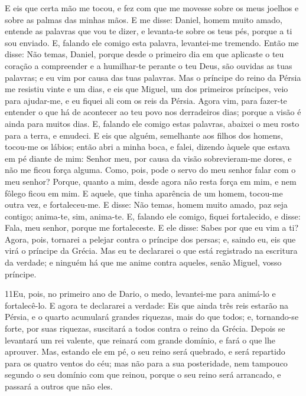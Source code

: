 E eis que certa mão me tocou, e fez com que me movesse sobre os
meus joelhos e sobre as palmas das minhas mãos. E me disse:
Daniel, homem muito amado, entende as palavras que vou te dizer, e
levanta-te sobre os teus pés, porque a ti sou enviado. E, falando
ele comigo esta palavra, levantei-me tremendo. Então me
disse: Não temas, Daniel, porque desde o primeiro dia em que
aplicaste o teu coração a compreender e a humilhar-te perante o teu
Deus, são ouvidas as tuas palavras; e eu vim por causa das tuas
palavras. Mas o príncipe do reino da Pérsia me resistiu vinte
e um dias, e eis que Miguel, um dos primeiros príncipes, veio para
ajudar-me, e eu fiquei ali com os reis da Pérsia. Agora vim,
para fazer-te entender o que há de acontecer ao teu povo nos
derradeiros dias; porque a visão é ainda para muitos dias. E,
falando ele comigo estas palavras, abaixei o meu rosto para a terra,
e emudeci. E eis que alguém, semelhante aos filhos dos
homens, tocou-me os lábios; então abri a minha boca, e falei,
dizendo àquele que estava em pé diante de mim: Senhor meu, por causa
da visão sobrevieram-me dores, e não me ficou força alguma.
Como, pois, pode o servo do meu senhor falar com o meu
senhor? Porque, quanto a mim, desde agora não resta força em mim, e
nem fôlego ficou em mim. E aquele, que tinha aparência de um
homem, tocou-me outra vez, e fortaleceu-me. E disse: Não
temas, homem muito amado, paz seja contigo; anima-te, sim, anima-te.
E, falando ele comigo, fiquei fortalecido, e disse: Fala, meu
senhor, porque me fortaleceste. E ele disse: Sabes por que eu
vim a ti? Agora, pois, tornarei a pelejar contra o príncipe dos
persas; e, saindo eu, eis que virá o príncipe da Grécia. Mas
eu te declararei o que está registrado na escritura da verdade; e
ninguém há que me anime contra aqueles, senão Miguel, vosso
príncipe.

\medskip

\lettrine{11} Eu, pois, no primeiro ano de Dario, o medo,
levantei-me para animá-lo e fortalecê-lo. E agora te declararei
a verdade: Eis que ainda três reis estarão na Pérsia, e o quarto
acumulará grandes riquezas, mais do que todos; e, tornando-se forte,
por suas riquezas, suscitará a todos contra o reino da Grécia.
Depois se levantará um rei valente, que reinará com grande
domínio, e fará o que lhe aprouver. Mas, estando ele em pé, o
seu reino será quebrado, e será repartido para os quatro ventos do
céu; mas não para a sua posteridade, nem tampouco segundo o seu
domínio com que reinou, porque o seu reino será arrancado, e passará
a outros que não eles.

